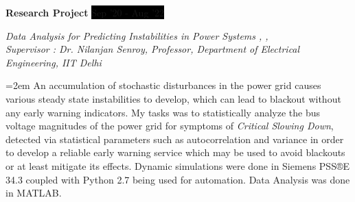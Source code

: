 \documentclass[paper=a4,fontsize=11pt]{scrartcl} %
\newcommand{\sepspace}{\vspace*{1em}}		%
\newcommand{\NewPart}[1]{\section*{\uppercase{#1}}}
\newcommand{\EducationEntry}[4]{
		\noindent \textbf{#1} \hfill      %
		\colorbox{Black}{%
			\parbox{10em}{%
			\hfill\color{White}#2}} \par  %
		\noindent \textit{#3} \par        %
		\noindent\hangindent=2em\hangafter=0 \small #4 %
		\normalsize \par}
\newcommand{\WorkEntry}[4]{				  %
		\noindent \textbf{#1} \hfill      %
		\colorbox{Black}{\color{White}#2} \par  %
		\noindent \textit{#3} \par              %
		\noindent\hangindent=2em\hangafter=0 \small #4 %
		\normalsize \par}
\begin{document}
\sepspace

\WorkEntry{Research Project}{Sep '20 - Aug '22}{Data Analysis for Predicting Instabilities in Power Systems \href{https://github.com/Realife-Brahmin/eld895_simulation_psse}{\textcolor{pythonblue}{\faGithub}}, \href{https://github.com/Realife-Brahmin/eld895_analysis_simulated_grids}{\textcolor{matlaborange}{\faGithub}}, \href{https://github.com/Realife-Brahmin/eld895_analysis_real_grids}{\textcolor{matlaborange}{\faGithub}}\\ Supervisor : Dr. Nilanjan Senroy, Professor, Department of Electrical Engineering, IIT Delhi}{An accumulation of stochastic disturbances in the power grid causes various steady state instabilities to develop, which can lead to blackout without any early warning indicators. My tasks was to statistically analyze the bus voltage magnitudes of the power grid for symptoms of \textit{Critical Slowing Down}, detected via statistical parameters such as autocorrelation and variance in order to develop a reliable early warning service which may be used to avoid blackouts or at least mitigate its effects. Dynamic simulations were done in Siemens PSS®E 34.3 coupled with Python 2.7 being used for automation. Data Analysis was done in MATLAB.}




\end{document}
